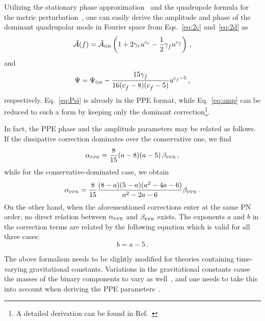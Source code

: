 \documentclass[prd,twocolumn,nofootinbib]{revtex4-1}
\newcommand\be{\begin{equation}}
\newcommand\ee{\end{equation}}
\newcommand{\PPE}{{\mbox{\tiny PPE}}}
\newcommand{\GR}{{\mbox{\tiny GR}}}
\begin{document}
Utilizing the stationary phase approximation~\cite{PhysRevD.62.084036,Yunes:2009yz} and the quadrupole formula for the metric perturbation~\cite{Blanchet:2002av}, one can easily derive the amplitude and phase of the dominant quadrupolar mode in Fourier space from Eqs.~\eqref{eq:2c} and~\eqref{eq:2d} as
\begin{equation}\label{eq:amp}
\tilde{\mathcal{A}}(f)=\tilde{\mathcal{A}}_{\GR} \left(1+2\gamma_ru^{c_r}-\frac{1}{2}\gamma_{\dot{f}}u^{c_{\dot{f}}}\right)\,,
\end{equation}
and
\be
\label{eq:Psi}
\Psi = \Psi_\GR  -\frac{15 \text{$\gamma_{\dot{f}} $}}{16 (\text{$c_{\dot{f}}$}-8) (\text{$c_{\dot{f}}$}-5)} u^{c_{\dot{f}}-5}\,,
\ee
respectively. Eq.~\eqref{eq:Psi} is already in the PPE format, while  Eq.~\eqref{eq:amp} can be reduced to such a form by keeping only the dominant correction\footnote{A detailed derivation can be found in Ref.~\cite{Tahura:2018zuq}}.


In fact, the PPE phase and the amplitude parameters may be related as follows. If the dissipative correction dominates over the conservative one, we find
\begin{equation}\label{eq:2w2}
\alpha_{\PPE} = \frac{8}{15} (a-8)(a-5) \, \beta_{\PPE}\,,
\end{equation}
while for the conservative-dominated case, we obtain
\begin{equation}\label{eq:2w3}
\alpha_{\PPE} =\frac{8}{15} \frac{(8-a)(5-a)(a^2-4a-6)}{a^2-2a-6} \beta_{\PPE}\,.
\end{equation}
On the other hand, when the aforementioned corrections enter at the same PN order, no direct relation between $\alpha_{\PPE}$ and $\beta_{\PPE}$ exists. The exponents $a$ and $b$ in the correction terms are related by the following equation which is valid for all three cases:
\begin{equation}
b=a-5\,.
\end{equation}


The above formalism needs to be slightly modified for theories containing time-varying gravitational constants. Variations in the gravitational constants cause the masses  of the binary components to vary as well~\cite{PhysRevLett.65.953}, and one needs to take this into account when deriving the PPE parameters~\cite{Tahura:2018zuq}.
\end{document}
